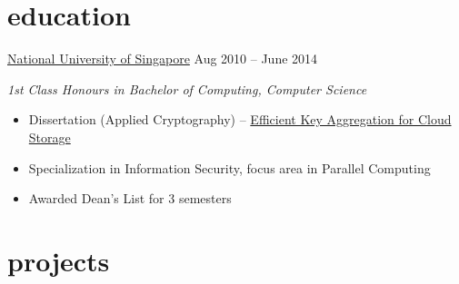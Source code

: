 \documentclass{friggeri-cv} %
\begin{document}
\section{education}
\entry
{\href{http://www.nus.edu.sg/}{National University of Singapore}}
{Aug 2010 -- June 2014}
{\emph{1st Class Honours in Bachelor of Computing, Computer Science}
\begin{itemize}
\item Dissertation (Applied Cryptography) -- \href{https://www.dropbox.com/s/litwm8etd4ot6m7/FYP\%20-\%20Efficient\%20Key\%20Aggregation\%20for\%20Cloud\%20Storage.pdf}{Efficient Key Aggregation for Cloud Storage}
\item Specialization in Information Security, focus area in Parallel Computing
\item Awarded Dean's List for 3 semesters
\end{itemize}
}

\vspace{-2.2\parsep}
\section{projects}
\end{document}
